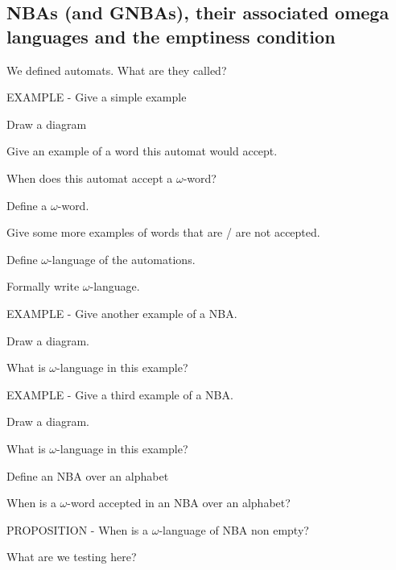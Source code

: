 \documentclass[fleqn]{article}
\begin{document}
\subsection{NBAs (and GNBAs), their associated omega languages and the emptiness condition}
\begin{enumerate}
    \item We defined automats. What are they called?
    {\color{red}\item EXAMPLE - Give a simple example}
    \begin{itemize}
        {\color{red}\item Draw a diagram}
        {\color{red}\item Give an example of a word this automat would accept.}
        {\color{red}\item When does this automat accept a $\omega$-word?}
        {\color{red}\item Define a $\omega$-word.}
        {\color{red}\item Give some more examples of words that are / are not accepted.}
        {\color{red}\item Define $\omega$-language of the automations.}
        {\color{blue}\item Formally write $\omega$-language.}
    \end{itemize}
    \item EXAMPLE - Give another example of a NBA.
    \begin{itemize}
        {\color{red}\item Draw a diagram.}
        {\color{red}\item What is $\omega$-language in this example?}
    \end{itemize}
    \item EXAMPLE - Give a third example of a NBA.
    \begin{itemize}
        {\color{red}\item Draw a diagram.}
        {\color{red}\item What is $\omega$-language in this example?}
    \end{itemize}
    {\color{red}\item Define an NBA over an alphabet}
    {\color{blue}\item When is a $\omega$-word accepted in an NBA over an alphabet?}
    {\color{red}\item PROPOSITION - When is a $\omega$-language of NBA non empty?}
    {\color{red}\item What are we testing here?}

\end{enumerate}
\end{document}

